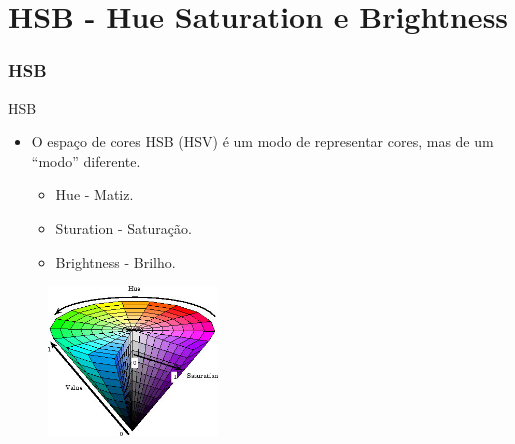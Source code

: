 \documentclass{beamer}
\begin{document}
\section{HSB - Hue Saturation e Brightness}
\begin{frame}
\frametitle{HSB}
		
		\begin{block}{HSB}
			\begin{itemize}
				\item O espaço de cores HSB (HSV) é um modo de representar cores, mas de um ``modo'' diferente.
				\begin{itemize}
					\item Hue - Matiz.
					\item Sturation - Saturação.
					\item Brightness - Brilho.
				\end{itemize}
			\end{itemize}
		\end{block}
		
		\begin{figure}[!h]
			\begin{center}
				\includegraphics[width=0.4\textwidth]{Figures/HSV}
			\end{center}
		\end{figure}		
\end{frame}
\end{document}
